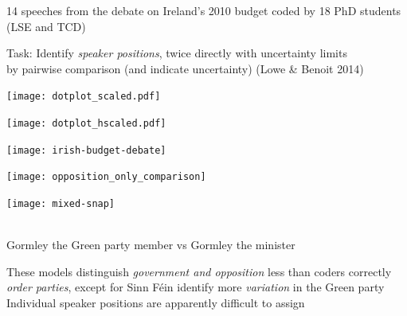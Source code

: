 \documentclass{mediumfoils}
\newcommand{\mkgrey}[1]{{\color{pale}#1}}
\begin{document}
%


14 speeches from the debate on Ireland's 2010 budget coded by 18 PhD students (LSE and TCD)

{Task}: Identify \textit{speaker positions}, twice
\ita
\itm directly with uncertainty limits \\
by pairwise comparison (and indicate uncertainty)
\itz
\mkgrey{(Lowe \& Benoit 2014)}


\centerline{\texttt{[image: dotplot\_scaled.pdf]}}

%


\centerline{\texttt{[image: dotplot\_hscaled.pdf]}}

\centerline{\texttt{[image: irish-budget-debate]}}

\centerline{\texttt{[image: opposition\_only\_comparison]}}


\centerline{\texttt{[image: mixed-snap]}}

~\\
Gormley the Green party member vs Gormley the minister


These models  
\ita
\itm distinguish \textit{government and opposition} less than coders
\itm correctly \textit{order parties}, {except} for Sinn F\'ein
\itm identify more \textit{variation} in the Green party
\itz
~\\
Individual speaker positions are apparently difficult to assign
\end{document}
